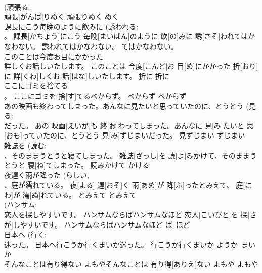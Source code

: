 \documentclass[8pt]{extreport}
\begin{document}
\begin{CJK}{UTF8}{min}
\\	(頑張る: 
\\	頑張[がんば]りぬく	頑張りぬく	ぬく	
\\	課長にこう毎晩のように飲みに (誘われる: 
\\	。	課長[かちょう]にこう 毎晩[まいばん]のように 飲[の]みに 誘[さそ]われてはかなわない。	誘われてはかなわない。	てはかなわない。	
\\	このことは今度お目にかかった 
\\	詳しくお話しいたします。	このことは 今度[こんど]お 目[め]にかかった 折[おり]に 詳[くわ]しくお 話[はな]しいたします。	折に	折に	
\\	ここにゴミを捨てる 
\\	。	ここにゴミを 捨[す]てるべからず。	べからず	べからず	
\\	あの映画も終わってしまった。あんなに見たいと思っていたのに、とうとう (見る: 
\\	だった。	あの 映画[えいが]も 終[お]わってしまった。あんなに 見[み]たいと 思[おも]っていたのに、とうとう 見[み]ずじまいだった。	見ずじまい	ずじまい	
\\	雑誌を (読む: 
\\	、そのままうとうと寝てしまった。	雑誌[ざっし]を 読[よ]みかけて、そのままうとうと 寝[ね]てしまった。	読みかけて	かける	
\\	夜遅く雨が降った (らしい, 
\\	、庭が濡れている。	夜[よる] 遅[おそ]く 雨[あめ]が 降[ふ]ったとみえて、 庭[にわ]が 濡[ぬ]れている。	とみえて	とみえて	
\\	(ハンサム: 
\\	恋人を探しやすいです。	ハンサムならばハンサムなほど 恋人[こいびと]を 探[さが]しやすいです。	ハンサムならばハンサムなほど	ば~ほど	
\\	日本へ (行く: 
\\	迷った。	日本へ行こうか行くまいか迷った。	行こうか行くまいか	ようか~まいか	
\\	そんなことは有り得ない	よもやそんなことは 有り得[ありえ]ない	よもや	よもや	
\end{CJK}
\end{document}
